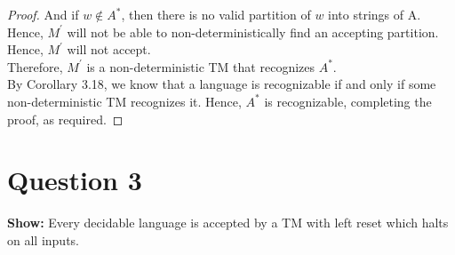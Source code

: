 \documentclass[12pt]{article}
\begin{document}
\begin{proof}
And if $w \not \in A^*$, then there is no valid partition of $w$ into strings of A. Hence, $M^\prime$ will not be able to non-deterministically find an accepting partition. Hence, $M^\prime$ will not accept. \\

Therefore, $M^\prime$ is a non-deterministic TM that recognizes $A^*$. \\

By Corollary 3.18, we know that a language is recognizable if and only if some non-deterministic TM recognizes it. Hence, $A^*$ is recognizable,  completing the proof, as required. 
\end{proof}

\newpage

\section*{Question 3}

\textbf{Show:} Every decidable language is accepted by a TM with left reset which halts on all inputs. 
\end{document}
